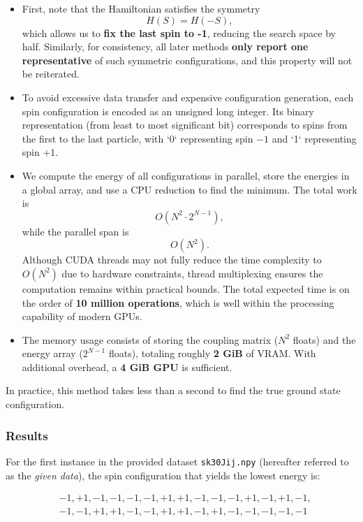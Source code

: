 \documentclass{article}
\begin{document}
\begin{itemize}
    \item First, note that the Hamiltonian satisfies the symmetry
    \[
    H\left(S\right) = H\left(-S\right),
    \]
    which allows us to \textbf{fix the last spin to -1}, reducing the search space by half. Similarly, for consistency, all later methods \textbf{only report one representative} of such symmetric configurations, and this property will not be reiterated.
    
    \item To avoid excessive data transfer and expensive configuration generation, each spin configuration is encoded as an unsigned long integer. Its binary representation (from least to most significant bit) corresponds to spins from the first to the last particle, with `0` representing spin $-1$ and `1` representing spin $+1$.
    
    \item We compute the energy of all configurations in parallel, store the energies in a global array, and use a CPU reduction to find the minimum. The total work is
    \[
    O\left(N^2 \cdot 2^{N-1}\right),
    \]
    while the parallel span is
    \[
    O\left(N^2\right).
    \]
    Although CUDA threads may not fully reduce the time complexity to $O\left(N^2\right)$ due to hardware constraints, thread multiplexing ensures the computation remains within practical bounds. The total expected time is on the order of \textbf{10 million operations}, which is well within the processing capability of modern GPUs.
    
    \item The memory usage consists of storing the coupling matrix ($N^2$ floats) and the energy array ($2^{N-1}$ floats), totaling roughly \textbf{2 GiB} of VRAM. With additional overhead, a \textbf{4 GiB GPU} is sufficient.
\end{itemize}

In practice, this method takes less than a second to find the true ground state configuration.

\subsubsection*{Results}

For the first instance in the provided dataset \texttt{sk30Jij.npy} (hereafter referred to as the \textit{given data}), the spin configuration that yields the lowest energy is:

\[
\begin{aligned}
&-1, +1, -1, -1, -1, -1, +1, +1, -1, -1, -1, +1, -1, +1, -1, \\
&-1, -1, +1, +1, -1, -1, +1, +1, -1, +1, -1, -1, -1, -1, -1
\end{aligned}
\]
\end{document}
